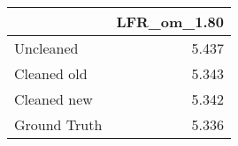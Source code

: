 \begin{tabular}{lr}
\toprule
{} & LFR_om_1.80 \\
\midrule
Uncleaned    &       5.437 \\
Cleaned old  &       5.343 \\
Cleaned new  &       5.342 \\
Ground Truth &       5.336 \\
\bottomrule
\end{tabular}
